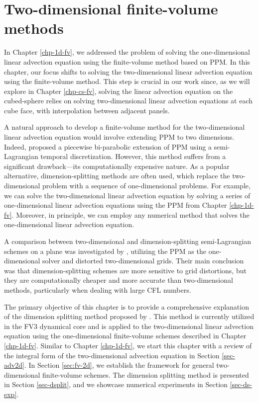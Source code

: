 \chapter{Two-dimensional finite-volume methods}
\label{chp-2d-fv}
In Chapter \ref{chp-1d-fv}, we addressed the problem of solving the one-dimensional
linear advection equation using the finite-volume method based on PPM. In this chapter, our focus shifts to solving the two-dimensional 
linear advection equation using the finite-volume method. This step is crucial in our work since, as we will explore in Chapter 
\ref{chp-cs-fv}, solving the linear advection equation on the cubed-sphere relies on solving two-dimensional linear advection equations 
at each cube face, with interpolation between adjacent panels.

A natural approach to develop a finite-volume method for the two-dimensional linear advection equation would involve extending PPM to 
two dimensions. Indeed, \citet{rancic:1992} proposed a piecewise bi-parabolic extension of PPM using a semi-Lagrangian temporal 
discretization. However, this method suffers from a significant drawback—its computationally expensive nature. As a popular alternative, 
dimension-splitting methods are often used, which replace the two-dimensional problem with a sequence of one-dimensional problems. For 
example, we can solve the two-dimensional linear advection equation by solving a series of one-dimensional linear advection equations 
using the PPM from Chapter \ref{chp-1d-fv}. Moreover, in principle, we can employ any numerical method that solves the one-dimensional 
linear advection equation.

A comparison between two-dimensional and dimension-splitting semi-Lagrangian schemes on a plane was investigated by \citet{chen:2017}, 
utilizing the PPM as the one-dimensional solver and distorted two-dimensional grids. Their main conclusion was that dimension-splitting 
schemes are more sensitive to grid distortions, but they are computationally cheaper and more accurate than two-dimensional methods, 
particularly when dealing with large CFL numbers.

The primary objective of this chapter is to provide a comprehensive explanation of the dimension splitting method proposed by 
\citet{lin:1996}. This method is currently utilized in the FV3 dynamical core and is applied to the two-dimensional linear advection 
equation using the one-dimensional finite-volume schemes described in Chapter \ref{chp-1d-fv}.
Similar to Chapter \ref{chp-1d-fv}, we start this chapter with a review of the integral form of the two-dimensional advection 
equation in Section \ref{sec-adv2d}. In Section \ref{sec:fv-2d}, we establish the framework for general two-dimensional finite-volume 
schemes. The dimension splitting method is presented in Section \ref{sec-dsplit}, and we showcase numerical experiments in Section 
\ref{sec-ds-exp}.
